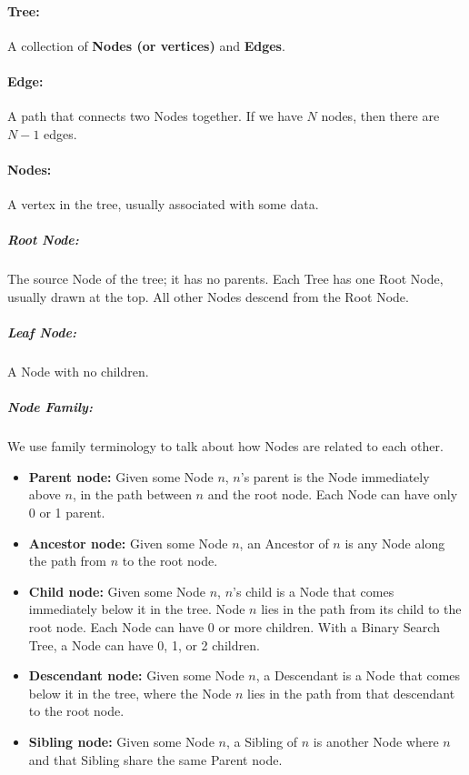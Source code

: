 \documentclass[a4paper,12pt,oneside]{book}
\begin{document}
{    \paragraph{Tree:} A collection of \textbf{Nodes (or vertices)} and \textbf{Edges}.

    \paragraph{Edge:} A path that connects two Nodes together. If we have $N$ nodes,
        then there are $N-1$ edges.

    \paragraph{Nodes:} A vertex in the tree, usually associated with some data.

    \subparagraph{Root Node:} The source Node of the tree; it has no parents.
    Each Tree has one Root Node, usually drawn at the top. All
    other Nodes descend from the Root Node.
    
    \subparagraph{Leaf Node:} A Node with no children.
    
    \subparagraph{Node Family:} We use family terminology to talk about
        how Nodes are related to each other.

        \begin{itemize}
            \item   \textbf{Parent node:} Given some Node $n$, $n$'s parent
                is the Node immediately above $n$, in the path between $n$
                and the root node. Each Node can have only 0 or 1 parent.

            \item   \textbf{Ancestor node:} Given some Node $n$, an Ancestor
                of $n$ is any Node along the path from $n$ to the root node.

            \item   \textbf{Child node:} Given some Node $n$, $n$'s child
                is a Node that comes immediately below it in the tree.
                Node $n$ lies in the path from its child to the root node.
                Each Node can have 0 or more children. With a Binary Search Tree,
                a Node can have 0, 1, or 2 children.

            \item   \textbf{Descendant node:} Given some Node $n$, a
                Descendant is a Node that comes below it in the tree, where
                the Node $n$ lies in the path from that descendant to the root node.

            \item   \textbf{Sibling node:} Given some Node $n$, a Sibling
                of $n$ is another Node where $n$ and that Sibling share the same
                Parent node.
        \end{itemize}

        \hrulefill
        }
\end{document}

